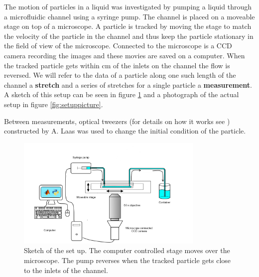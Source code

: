 The motion of particles in a liquid was investigated by pumping a liquid through a microfluidic channel using a syringe pump. The channel is placed on a moveable stage on top of a microscope. A particle is tracked by moving the stage to match the velocity of the particle in the channel and thus keep the particle stationary in the field of view of the microscope. Connected to the microscope is a CCD camera recording the images and these movies are saved on a computer. When the tracked particle gets within \unit[1]{cm} of the inlets on the channel the flow is reversed. We will refer to the data of a particle along one such length of the channel a \textbf{stretch} and a series of stretches for a single particle a \textbf{measurement}. A sketch of this setup can be seen in figure \ref{fig:setupsketch} and a photograph of the actual setup in figure \ref{fig:setuppicture}. 

Between measurements, optical tweezers (for details on how it works see \cite{OpticalTweezer}) constructed by A. Laas  \cite{alexanderThesis} was used to change the initial condition of the particle. 


\begin{figure}[H]
\centering
\includegraphics[width=0.8\textwidth]{figures/method/setupsketch.png}
\caption{Sketch of the set up. The computer controlled stage moves over the microscope. The pump reverses when the tracked particle gets close to the inlets of the channel.}\label{fig:setupsketch}
\end{figure}

